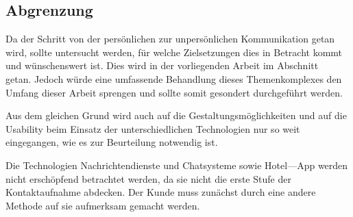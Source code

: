 \subsection{Abgrenzung} %

Da der Schritt von der persönlichen  zur unpersönlichen Kommunikation getan wird, sollte untersucht werden, für welche Zielsetzungen dies in Betracht kommt und wünschenswert ist. Dies wird in der vorliegenden Arbeit im Abschnitt~ getan. Jedoch würde eine umfassende Behandlung dieses Themenkomplexes den Umfang dieser Arbeit sprengen und sollte somit gesondert durchgeführt werden.

Aus dem gleichen Grund wird auch auf die Gestaltungsmöglichkeiten und auf die Usability beim Einsatz der unterschiedlichen Technologien nur so weit eingegangen, wie es zur Beurteilung notwendig ist.

Die Technologien Nachrichtendienste und Chatsysteme sowie Hotel––App werden nicht erschöpfend betrachtet werden, da sie nicht die erste Stufe der Kontaktaufnahme abdecken. Der Kunde muss zunächst durch eine andere Methode auf sie aufmerksam gemacht werden.
